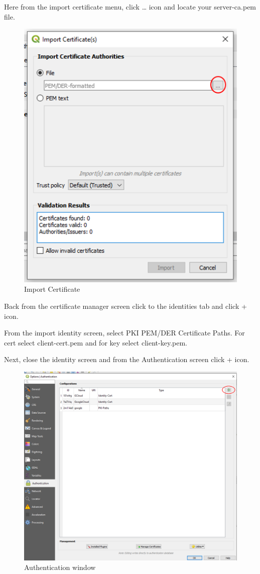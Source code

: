 \documentclass[
]{book}
\begin{document}
Here from the import certificate menu, click \ldots{} icon and locate your server-ca.pem file.

\begin{figure}
\centering
\includegraphics{Images/importcertificate.png}
\caption{Import Certificate}
\end{figure}

Back from the certificate manager screen click to the identities tab and click + icon.

From the import identity screen, select PKI PEM/DER Certificate Paths. For cert select client-cert.pem and for key select client-key.pem.

Next, close the identity screen and from the Authentication screen click + icon.

\begin{figure}
\centering
\includegraphics{Images/authentication.png}
\caption{Authentication window}
\end{figure}
\end{document}
